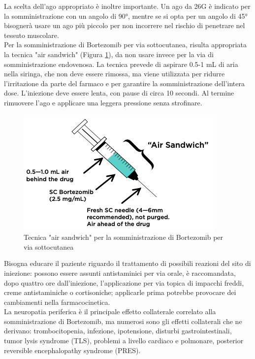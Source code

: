La scelta dell’ago appropriato è inoltre importante. Un ago da 26G è indicato per la somministrazione con un angolo di
90°, mentre se si opta per un angolo di 45° bisognerà usare un ago più piccolo per non incorrere nel rischio di 
penetrare nel tessuto muscolare\cite{BORTNURSES}.\\
Per la somministrazione di Bortezomib per via sottocutanea, risulta appropriata la tecnica "air sandwich" 
(Figura \ref{fig:FIGURE_3.7}),
da non usare invece per la via di somministrazione endovenosa. La tecnica prevede di aspirare 0.5-1 mL 
di aria nella siringa, che non deve essere rimossa, ma viene utilizzata per ridurre l'irritazione da parte del farmaco e 
per garantire la somministrazione dell'intera dose. L'iniezione deve essere lenta, con pause di circa 10 secondi. 
Al termine rimuovere l'ago e applicare una leggera pressione senza strofinare\cite{BORTNURSES}.

\begin{figure}[H]
    \begin{center}
    \includegraphics[width=0.5\columnwidth]{img/SIRINGA.png}
    \vspace{-3mm}
    \end{center}
    \caption{ Tecnica "air sandwich" per la somministrazione di Bortezomib per via sottocutanea
    \cite{BORTEZOMIB}}
    \label{fig:FIGURE_3.7}
\end{figure}

Bisogna educare il paziente riguardo il trattamento di possibili reazioni del sito di iniezione: 
possono essere assunti antistaminici per via orale, è raccomandata, dopo quattro ore dall’iniezione, 
l’applicazione per via topica di impacchi freddi, creme antistaminiche o cortisoniche;
applicarle prima potrebbe provocare dei cambiamenti nella farmacocinetica\cite{BORTEZOMIB}.\\
La neuropatia periferica è il principale effetto collaterale correlato alla somministrazione di Bortezomib, 
ma numerosi sono gli effetti collaterali che ne derivano: trombocitopenia, infezione, ipotensione, disturbi 
gastrointestinali, tumor lysis syndrome (TLS), problemi a livello cardiaco e polmonare, posterior reversible 
encephalopathy syndrome (PRES)\cite{BORTNURSES}.

